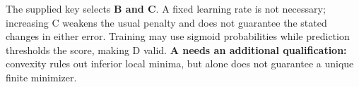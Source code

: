 The supplied key selects \textbf{B and C}. A fixed learning rate is not necessary; increasing C weakens the usual penalty and does not guarantee the stated changes in either error. Training may use sigmoid probabilities while prediction thresholds the score, making D valid. \textbf{A needs an additional qualification:} convexity rules out inferior local minima, but alone does not guarantee a unique finite minimizer.
